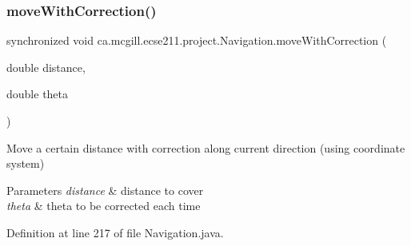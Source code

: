 \subsubsection{\texorpdfstring{move\+With\+Correction()}{moveWithCorrection()}}
{\footnotesize\ttfamily synchronized void ca.\+mcgill.\+ecse211.\+project.\+Navigation.\+move\+With\+Correction (\begin{DoxyParamCaption}\item[{double}]{distance,  }\item[{double}]{theta }\end{DoxyParamCaption})}

Move a certain distance with correction along current direction (using coordinate system)


\begin{DoxyParams}{Parameters}
{\em distance} & distance to cover \\
\hline
{\em theta} & theta to be corrected each time \\
\hline
\end{DoxyParams}


Definition at line 217 of file Navigation.\+java.


